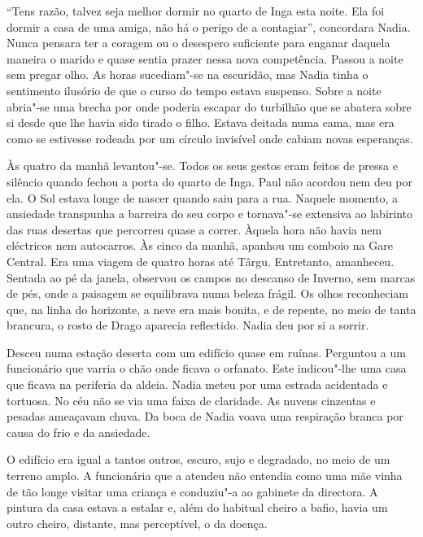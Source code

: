 ``Tens razão, talvez seja melhor dormir no quarto de Inga esta noite. Ela
foi dormir a casa de uma amiga, não há o perigo de a contagiar'',
concordara Nadia. Nunca pensara ter a coragem ou o desespero suficiente
para enganar daquela maneira o marido e quase sentia prazer nessa nova
competência. Passou a noite sem pregar olho. As horas sucediam"-se na
escuridão, mas Nadia tinha o sentimento ilusório de que o curso do tempo
estava suspenso. Sobre a noite abria"-se uma brecha por onde poderia
escapar do turbilhão que se abatera sobre si desde que lhe havia sido
tirado o filho. Estava deitada numa cama, mas era como se estivesse
rodeada por um círculo invisível onde cabiam novas esperanças.

Às quatro da manhã levantou"-se. Todos os seus gestos eram feitos de
pressa e silêncio quando fechou a porta do quarto de Inga. Paul não
acordou nem deu por ela. O Sol estava longe de nascer quando saiu para a
rua. Naquele momento, a ansiedade transpunha a barreira do seu corpo e
tornava"-se extensiva ao labirinto das ruas desertas que percorreu quase
a correr. Àquela hora não havia nem
eléctricos nem autocarros. Às cinco da manhã, apanhou um comboio na Gare
Central. Era uma viagem de quatro horas até Târgu. Entretanto,
amanheceu. Sentada ao pé da janela, observou os campos no descanso de
Inverno, sem marcas de pés, onde a paisagem se equilibrava numa beleza
frágil. Os olhos reconheciam que, na linha do horizonte, a neve era
mais bonita, e de repente, no meio de tanta brancura, o rosto de Drago
aparecia reflectido. Nadia deu por si a sorrir.

Desceu numa estação deserta com um edifício quase em ruínas. Perguntou a
um funcionário que varria o chão onde ficava o orfanato. Este
indicou"-lhe uma casa que ficava na periferia da aldeia. Nadia meteu por
uma estrada acidentada e tortuosa. No céu não se via uma faixa de
claridade. As nuvens cinzentas e pesadas ameaçavam chuva. Da boca de
Nadia voava uma respiração branca por causa do frio e da ansiedade.

\bigskip

O edifício era igual a tantos outros, escuro, sujo e degradado, no
meio de um terreno amplo. A funcionária que a atendeu não entendia como
uma mãe vinha de tão longe visitar uma criança e conduziu"-a ao gabinete
da directora. A pintura da casa estava a estalar e, além do habitual
cheiro a bafio, havia um outro cheiro, distante, mas perceptível, o da
doença.

